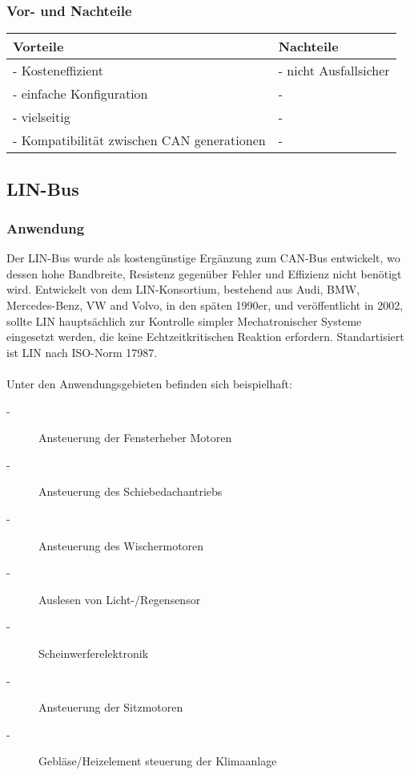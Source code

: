     \subsubsection{Vor- und Nachteile}
    \begin{center}
        \begin{tabular}{p{5.5cm} p{5.5cm}}
            \hline
            Vorteile & Nachteile\\
            \hline
            \hline - Kosteneffizient & - nicht Ausfallsicher\\
            \hline - einfache Konfiguration & - \\
            \hline - vielseitig & - \\
            \hline - Kompatibilität zwischen CAN generationen & - \\
            \hline
        \end{tabular}            
    \end{center}
    
\subsection{LIN-Bus}
    \subsubsection{Anwendung}
    Der LIN-Bus wurde als kostengünstige Ergänzung zum CAN-Bus entwickelt, wo dessen hohe
    Bandbreite, Resistenz gegenüber Fehler und Effizienz nicht benötigt wird. Entwickelt 
    von dem LIN-Konsortium, bestehend aus Audi, BMW, Mercedes-Benz, VW and Volvo, in den 
    späten 1990er, und veröffentlicht in 2002, sollte LIN hauptsächlich zur Kontrolle 
    simpler Mechatronischer Systeme eingesetzt werden, die keine Echtzeitkritischen Reaktion 
    erfordern. Standartisiert ist LIN nach ISO-Norm 17987.
    ~\cite{LA_Bosch_6te_auflage}\\\\
    Unter den Anwendungsgebieten befinden sich beispielhaft:
    \begin{description}
    \item[-] Ansteuerung der Fensterheber Motoren
    \item[-] Ansteuerung des Schiebedachantriebs
    \item[-] Ansteuerung des Wischermotoren
    \item[-] Auslesen von Licht-/Regensensor
    \item[-] Scheinwerferelektronik
    \item[-] Ansteuerung der Sitzmotoren
    \item[-] Gebläse/Heizelement steuerung der Klimaanlage
    \end{description}

